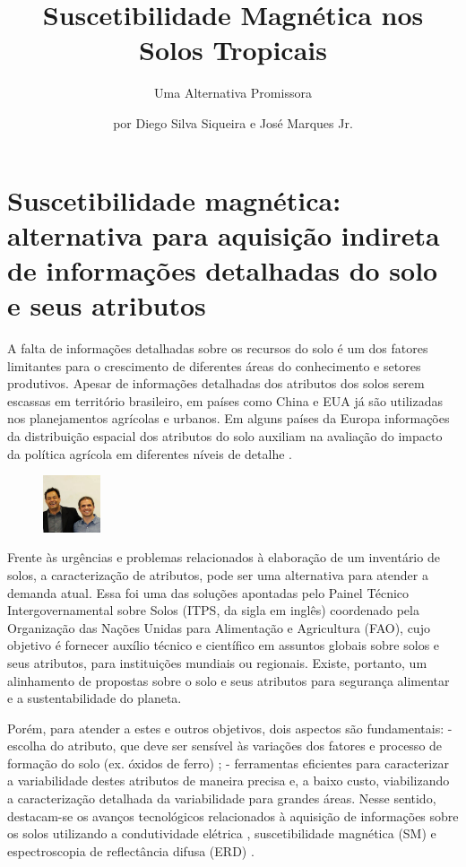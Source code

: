 \title{Suscetibilidade Magnética nos Solos Tropicais}
\subtitle{Uma Alternativa Promissora}
\author{por Diego Silva Siqueira e José Marques Jr.}
\maketitle

\section{Suscetibilidade magnética: alternativa para aquisição indireta de informações detalhadas do solo e seus atributos}
\label{sec:1}

A falta de informações detalhadas sobre os recursos do solo é um dos fatores limitantes para o crescimento de diferentes áreas do conhecimento e setores produtivos. Apesar de informações detalhadas dos atributos dos solos serem escassas em território brasileiro, em países como China \citep{liu:2013} e EUA \citep{franze:2006} já são utilizadas nos planejamentos agrícolas e urbanos. Em alguns países da Europa informações da distribuição espacial dos atributos do solo auxiliam na avaliação do impacto da política agrícola em diferentes níveis de detalhe \citep{vandelden:2010}.

\begin{figure}
\includegraphics[width=0.15\textwidth]{figuras/foto-diego-junior}
\end{figure}

Frente às urgências e problemas relacionados à elaboração de um inventário de solos, a caracterização de atributos, pode ser uma alternativa para atender a demanda atual. Essa foi uma das soluções apontadas pelo Painel Técnico Intergovernamental sobre Solos (ITPS, da sigla em inglês) coordenado pela Organização das Nações Unidas para Alimentação e Agricultura (FAO), cujo objetivo é fornecer auxílio técnico e científico em assuntos globais sobre solos e seus atributos, para instituições mundiais ou regionais. Existe, portanto, um alinhamento de propostas sobre o solo e seus atributos para segurança alimentar e a sustentabilidade do planeta.




Porém, para atender a estes e outros objetivos, dois aspectos são fundamentais: - escolha do atributo, que deve ser sensível às variações dos fatores e processo de formação do solo (ex. óxidos de ferro) \citep{camargo:2013}; - ferramentas eficientes para caracterizar a variabilidade destes atributos de maneira precisa e, a baixo custo, viabilizando a caracterização detalhada da variabilidade para grandes áreas. Nesse sentido, destacam-se os avanços tecnológicos relacionados à aquisição de informações sobre os solos utilizando a condutividade elétrica \citep{brennin:2008}, suscetibilidade magnética (SM) \citep{grimley-vepraskas:2000} e espectroscopia de reflectância difusa (ERD) \citep{torrent-barron:1993}.




